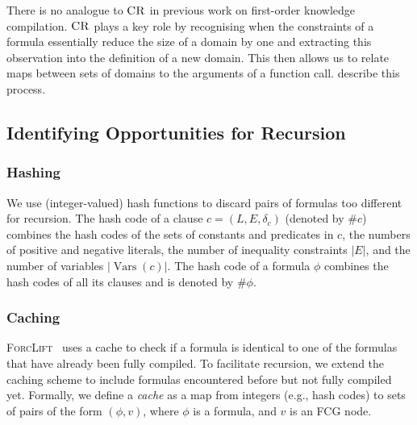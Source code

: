 \documentclass{article}
\DeclareMathOperator{\CR}{\textsc{CR}}
\DeclareMathOperator{\Vars}{Vars}
\begin{document}
There is no analogue to $\CR$ in previous work on first-order knowledge
compilation. $\CR$ plays a key role by recognising when the constraints of a
formula essentially reduce the size of a domain by one and extracting this
observation into the definition of a new domain. This then allows us to relate
maps between sets of domains to the arguments of a function call.
 describe this process.

\subsection{Identifying Opportunities for Recursion}\label{sec:ref}

\subsubsection{Hashing}
We use (integer-valued) hash functions to discard pairs of formulas too
different for recursion. The hash code of a clause $c = (L, E, \delta_{c})$
(denoted by $\# c$) combines the hash codes of the sets of constants and
predicates in $c$, the numbers of positive and negative literals, the number of
inequality constraints $|E|$, and the number of variables $|\Vars(c)|$. The hash
code of a formula $\phi$ combines the hash codes of all its clauses and is
denoted by $\#\phi$.

\subsubsection{Caching}
\textsc{ForcLift}~\cite{DBLP:conf/ijcai/BroeckTMDR11} uses a cache to check if a
formula is identical to one of the formulas that have already been fully
compiled. To facilitate recursion, we extend the caching scheme to include
formulas encountered before but not fully compiled yet. Formally, we define a
\emph{cache} as a map from integers (e.g., hash codes) to sets of pairs of the
form $(\phi, v)$, where $\phi$ is a formula, and $v$ is an FCG node.
\end{document}
